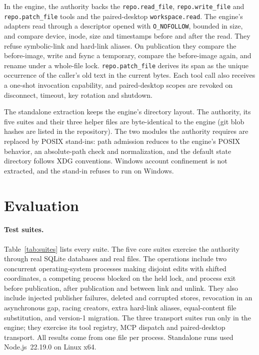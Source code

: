 \documentclass[10pt]{article}
\newcommand{\code}[1]{\texttt{#1}}
\begin{document}
In the engine, the authority backs the \code{repo.read\_file}, \code{repo.write\_file} and \code{repo.patch\_file} tools and the paired-desktop \code{workspace.read}. The engine's adapters read through a descriptor opened with \code{O\_NOFOLLOW}, bounded in size, and compare device, inode, size and timestamps before and after the read. They refuse symbolic-link and hard-link aliases. On publication they compare the before-image, write and fsync a temporary, compare the before-image again, and rename under a whole-file lock. \code{repo.patch\_file} derives its span as the unique occurrence of the caller's old text in the current bytes. Each tool call also receives a one-shot invocation capability, and paired-desktop scopes are revoked on disconnect, timeout, key rotation and shutdown.

The standalone extraction keeps the engine's directory layout. The authority, its five suites and their three helper files are byte-identical to the engine (git blob hashes are listed in the repository). The two modules the authority requires are replaced by POSIX stand-ins: path admission reduces to the engine's POSIX behavior, an absolute-path check and normalization, and the default state directory follows XDG conventions. Windows account confinement is not extracted, and the stand-in refuses to run on Windows.

\section{Evaluation}\label{sec:eval}

\paragraph{Test suites.}
Table~\ref{tab:suites} lists every suite. The five core suites exercise the authority through real SQLite databases and real files. The operations include two concurrent operating-system processes making disjoint edits with shifted coordinates, a competing process blocked on the held lock, and process exit before publication, after publication and between link and unlink. They also include injected publisher failures, deleted and corrupted stores, revocation in an asynchronous gap, racing creators, extra hard-link aliases, equal-content file substitution, and version-1 migration. The three transport suites run only in the engine; they exercise its tool registry, MCP dispatch and paired-desktop transport. All results come from one file per process. Standalone runs used Node.js~22.19.0 on Linux x64.
\end{document}
